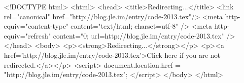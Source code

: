 <!DOCTYPE html>
<html>
<head>
<title>Redirecting...</title>
<link rel="canonical" href="http://blog.jle.im/entry/code-2013.tex"/>
<meta http-equiv="content-type" content="text/html; charset=utf-8" />
<meta http-equiv="refresh" content="0; url=http://blog.jle.im/entry/code-2013.tex" />
</head>
<body>
  <p><strong>Redirecting...</strong></p>
  <p><a href='http://blog.jle.im/entry/code-2013.tex'>Click here if you are not redirected.</a></p>
  <script>
    document.location.href = "http://blog.jle.im/entry/code-2013.tex";
  </script>
</body>
</html>
